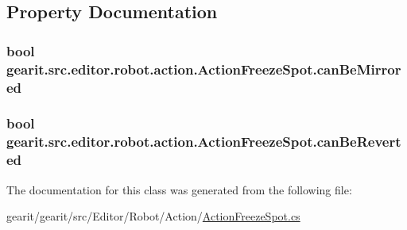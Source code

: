 \subsection{Property Documentation}
\hypertarget{classgearit_1_1src_1_1editor_1_1robot_1_1action_1_1_action_freeze_spot_a653f1626c6d31a9a9455fc5865033704}{
\subsubsection[{can\+Be\+Mirrored}]{\setlength{\rightskip}{0pt plus 5cm}bool gearit.\+src.\+editor.\+robot.\+action.\+Action\+Freeze\+Spot.\+can\+Be\+Mirrored\hspace{0.3cm}{\ttfamily [get]}}}\label{classgearit_1_1src_1_1editor_1_1robot_1_1action_1_1_action_freeze_spot_a653f1626c6d31a9a9455fc5865033704}
\hypertarget{classgearit_1_1src_1_1editor_1_1robot_1_1action_1_1_action_freeze_spot_a13eb5d3d1682cc400c3356ea69814193}{
\subsubsection[{can\+Be\+Reverted}]{\setlength{\rightskip}{0pt plus 5cm}bool gearit.\+src.\+editor.\+robot.\+action.\+Action\+Freeze\+Spot.\+can\+Be\+Reverted\hspace{0.3cm}{\ttfamily [get]}}}\label{classgearit_1_1src_1_1editor_1_1robot_1_1action_1_1_action_freeze_spot_a13eb5d3d1682cc400c3356ea69814193}


The documentation for this class was generated from the following file\+:\begin{DoxyCompactItemize}
\item 
gearit/gearit/src/\+Editor/\+Robot/\+Action/\hyperlink{_action_freeze_spot_8cs}{Action\+Freeze\+Spot.\+cs}\end{DoxyCompactItemize}
